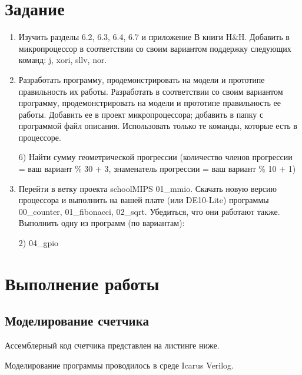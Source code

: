 \documentclass[a4paper,14pt]{article}
\begin{document}
	
	\tableofcontents
	\pagebreak
	\section{Задание}
	
	\begin{enumerate}
		\item Изучить разделы 6.2, 6.3, 6.4, 6.7 и приложение В книги H\&H.
		Добавить в микропроцессор в соответствии со своим вариантом	поддержку следующих команд: j, xori, sllv, nor.
		
		\item Разработать программу, продемонстрировать на модели и прототипе правильность их работы.
		Разработать в соответствии со своим вариантом программу, продемонстрировать на модели и прототипе правильность ее работы.
		Добавить ее в проект микропроцессора; добавить в папку с программой файл описания.
		Использовать только те команды, которые есть в процессоре.
		
		6) Найти сумму геометрической прогрессии (количество членов прогрессии = ваш
		вариант \% 30 + 3, знаменатель прогрессии = ваш вариант \% 10 + 1)
		
		\item Перейти в ветку проекта schoolMIPS 01\_mmio.
		Скачать новую версию процессора и выполнить на вашей плате (или DE10-Lite)
		программы 00\_counter, 01\_fibonacci, 02\_sqrt. Убедиться, что они работают также.
		Выполнить одну из программ (по вариантам):
		
		2) 04\_gpio
	\end{enumerate}

	
	\section{Выполнение работы}
	
	\subsection{Моделирование счетчика}
	
	Ассемблерный код счетчика представлен на листинге ниже.
	
	{\small {}}
	
	Моделирование программы проводилось в среде Icarus Verilog.
	
\end{document}
